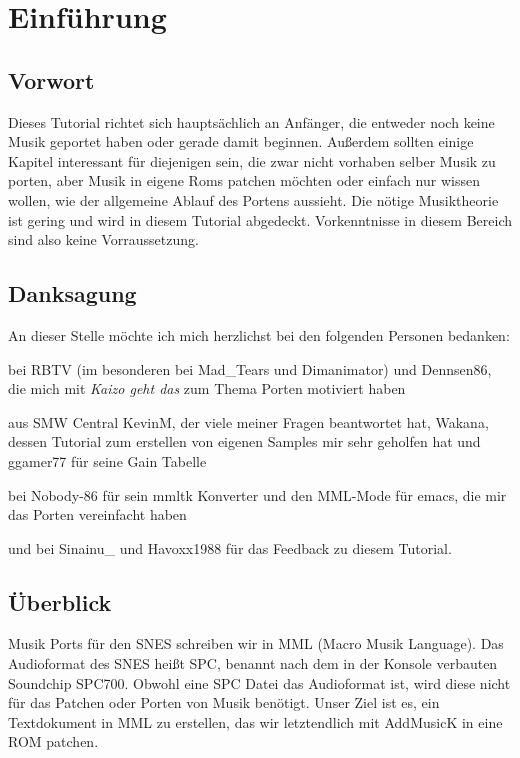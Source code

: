 

\section{Einführung}

\subsection{Vorwort}
Dieses Tutorial richtet sich hauptsächlich an Anfänger, die entweder noch keine Musik geportet haben oder gerade damit beginnen. Außerdem sollten einige Kapitel interessant für diejenigen sein, die zwar nicht vorhaben selber Musik zu porten, aber Musik in eigene Roms patchen möchten oder einfach nur wissen wollen, wie der allgemeine Ablauf des Portens aussieht.
Die nötige Musiktheorie ist gering und wird in diesem Tutorial abgedeckt. Vorkenntnisse in diesem Bereich sind also keine Vorraussetzung.

\subsection*{Danksagung}

An dieser Stelle möchte ich mich herzlichst bei den folgenden Personen bedanken:

\medskip

bei RBTV (im besonderen bei Mad\_Tears und Dimanimator) und Dennsen86, die mich mit \textit{Kaizo geht das} zum Thema Porten motiviert haben

\medskip

aus SMW Central KevinM, der viele meiner Fragen beantwortet hat, Wakana, dessen Tutorial zum erstellen von eigenen Samples mir sehr geholfen hat und ggamer77 für seine Gain Tabelle

\medskip

bei Nobody-86 für sein mmltk Konverter und den MML-Mode für emacs, die mir das Porten vereinfacht haben

\medskip

und bei Sinainu\_ und Havoxx1988 für das Feedback zu diesem Tutorial.


\newpage

\subsection{Überblick}

Musik Ports für den SNES schreiben wir in MML (Macro Musik Language). Das Audioformat des SNES heißt SPC, benannt nach dem in der Konsole verbauten Soundchip SPC700.
Obwohl eine SPC Datei das Audioformat ist, wird diese nicht für das Patchen oder Porten von Musik benötigt. Unser Ziel ist es, ein Textdokument in MML zu erstellen, das wir letztendlich mit AddMusicK in eine ROM patchen.


